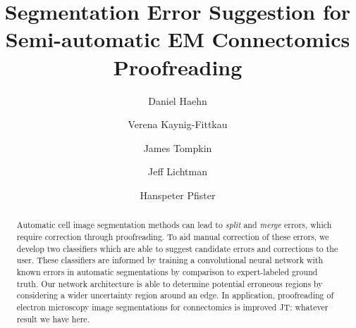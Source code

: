 \documentclass{llncs}
\newcommand{\tnote}[3]{{\color{#2}#1: #3}}
\newcommand{\JT}[1]{\tnote{JT}{blue}{#1}}
\begin{document}
%
\title{Segmentation Error Suggestion for Semi-automatic EM Connectomics Proofreading}
%
%
\author{Daniel Haehn \and Verena Kaynig-Fittkau
\and James Tompkin \and Jeff Lichtman \and Hanspeter Pfister}
%
%
%

\maketitle              %

\begin{abstract}
Automatic cell image segmentation methods can lead to \emph{split} and \emph{merge} errors, which require correction through proofreading. To aid manual correction of these errors, we develop two classifiers which are able to suggest candidate errors and corrections to the user. These classifiers are informed by training a convolutional neural network with known errors in automatic segmentations by comparison to expert-labeled ground truth. Our network architecture is able to determine potential erroneous regions by considering a wider uncertainty region around an edge. In application, proofreading of electron microscopy image segmentations for connectomics is improved \JT{whatever result we have here}.
\end{abstract}
%








%
%


\end{document}
